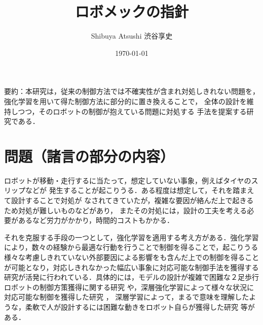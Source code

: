 \documentclass[a4paper,11pt]{jsarticle}
\begin{document}
\title{ロボメックの指針}
\author{Shibuya Atsushi 渋谷享史}
\date{\today}
\maketitle

要約：本研究は，従来の制御方法では不確実性が含まれ対処しきれない問題を，
強化学習を用いて得た制御方法に部分的に置き換えることで，
全体の設計を維持しつつ，そのロボットの制御が抱えている問題に対処する
手法を提案する研究である．

\section{問題（諸言の部分の内容）}

ロボットが移動・走行するに当たって，想定していない事象，例えばタイヤのスリップなどが
発生することが起こりうる．ある程度は想定して，それを踏まえて設計することで対処が
なされてきていたが，複雑な要因が絡んだ上で起きるため対処が難しいものなどがあり，
またその対処には，設計の工夫を考える必要があるなど労力がかかり，時間的コストもかかる．\par
それを克服する手段の一つとして，強化学習を適用する考え方がある．強化学習により，数々の経験から最適な行動を行うことで制御を得ることで，起こりうる様々な考慮しきれていない外部要因による影響をも含んだ上での制御を得ることが可能となり，対応しきれなかった幅広い事象に対応可能な制御手法を獲得する研究が活発に行われている．具体的には，モデルの設計が複雑で困難な２足歩行ロボットの制御方策獲得に関する研究
\cite{Actor-Critic型強化学習を用いたヒューマノイドロボットの動作獲得に関する研究}や，深層強化学習によって様々な状況に対応可能な制御を獲得した研究
\cite{深層強化学習を用いた全方位移動ロボットの行動生成手法の開発}，
深層学習によって，まるで意味を理解したような，柔軟で人が設計するには困難な動きをロボット自らが獲得した研究
\cite{視覚センサ付き実ロボットによる箱押し行動の獲得}等がある．\par
\end{document}
